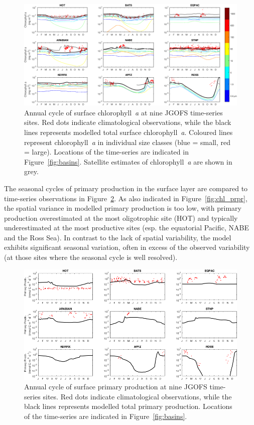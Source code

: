 \documentclass[gmd, manuscript]{copernicus}
\begin{document}
{\begin{figure}[htbp]
\begin{center}
\includegraphics[width=1.075\linewidth]{Final_figures/Fig_17.png}
\caption{Annual cycle of surface chlorophyll~\textit{a} at nine JGOFS time-series sites. Red dots indicate climatological observations, while the black lines represents modelled total surface chlorophyll~\textit{a}. Coloured lines represent chlorophyll~\textit{a} in individual size classes (blue = small, red = large). Locations of the time-series are indicated in Figure~\ref{fig:basins}. Satellite estimates of chlorophyll~\textit{a} are shown in grey.}
\label{fig:jgofs_chl}
\end{center}
\end{figure}

The seasonal cycles of primary production in the surface layer are compared to time-series observations in Figure~\ref{fig:jgofs_prpr}. As also indicated in Figure~\ref{fig:chl_prpr}, the spatial variance in modelled primary production is too low, with primary production overestimated at the most oligotrophic site (HOT) and typically underestimated at the most productive sites (esp. the equatorial Pacific, NABE and the Ross Sea). In contrast to the lack of spatial variability, the model exhibits significant seasonal variation, often in excess of the observed variability (at those sites where the seasonal cycle is well resolved).

\begin{figure}[htbp]
\begin{center}
\includegraphics[width=\linewidth]{Final_figures/Fig_18.png}
\caption{Annual cycle of surface primary production at nine JGOFS time-series sites. Red dots indicate climatological observations, while the black lines represents modelled total primary production. Locations of the time-series are indicated in Figure~\ref{fig:basins}.}
\label{fig:jgofs_prpr}
\end{center}
\end{figure}

}
\end{document}
